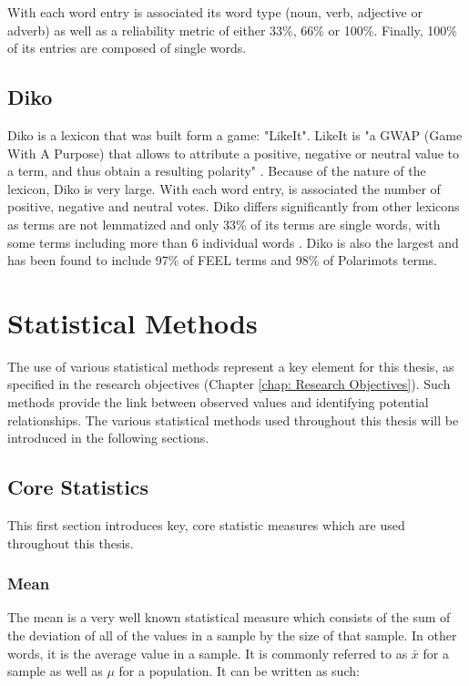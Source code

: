 With each word entry is associated its word type (noun, verb, adjective or adverb) as well as a reliability metric of either 33\%, 66\% or 100\%. Finally, 100\% of its entries are composed of single words.

\subsection{Diko}\label{chap: diko}

Diko is a lexicon that was built form a game: "LikeIt". LikeIt is "a GWAP (Game With A Purpose) that allows to attribute a positive, negative or neutral value to a term, and thus obtain a resulting polarity" \citep{lafourcade2015collecting}. Because of the nature of the lexicon, Diko is very large. With each word entry, is associated the number of positive, negative and neutral votes. Diko differs significantly from other lexicons as terms are not lemmatized and only 33\% of its terms are single words, with some terms including more than 6 individual words \citep{abdaoui2017feel}. Diko is also the largest and has been found to include 97\% of FEEL terms and 98\% of Polarimots terms.

\section{Statistical Methods}\label{Statistical Methods}

The use of various statistical methods represent a key element for this thesis, as specified in the research objectives (Chapter \ref{chap: Research Objectives}). Such methods provide the link between observed values and identifying potential relationships. The various statistical methods used throughout this thesis will be introduced in the following sections.

\subsection{Core Statistics}

This first section introduces key, core statistic measures which are used throughout this thesis.

\subsubsection{Mean}

The mean is a very well known statistical measure which consists of the sum of the deviation of all of the values in a sample by the size of that sample. In other words, it is the average value in a sample. It is commonly referred to as $\bar{x}$ for a sample as well as $\mu$ for a population. It can be written as such:

